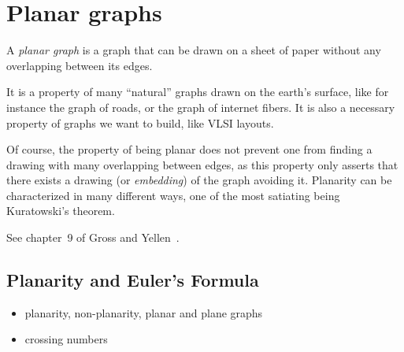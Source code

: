 
\chapter{Planar graphs}
\label{chap:planar_graphs}

A {\it planar graph} is a graph that can be drawn on a sheet of paper without any overlapping between its edges.

It is a property of many ``natural'' graphs drawn on the earth's surface, like for instance the graph of roads, or the graph of internet fibers. It is also a necessary property of graphs we want to build, like VLSI layouts.

Of course, the property of being planar does not prevent one from finding a drawing with many overlapping between edges, as this property only asserts that there exists a drawing (or {\it embedding}) of the graph avoiding it. Planarity can be characterized in many different ways, one of the most satiating being Kuratowski's theorem.

See chapter~9 of Gross and Yellen~\cite{GrossYellen1999}.



\section{Planarity and Euler's Formula}

\begin{itemize}
\item planarity, non-planarity, planar and plane graphs

\item crossing numbers
\end{itemize}

